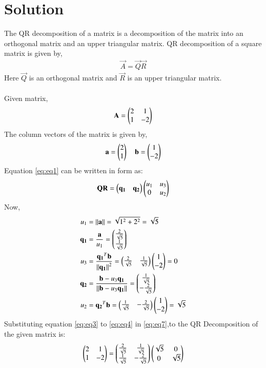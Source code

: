 \documentclass[journal,12pt,twocolumn]{IEEEtran}
\begin{document}
\section{Solution}
The QR decomposition  of a matrix is a decomposition of the matrix into an orthogonal matrix and an upper triangular matrix.
QR decomposition of a square matrix is given by,
\begin{align}
    \vec{A} = \vec{Q}\vec{R}
\end{align}
Here  $\vec{Q}$ is an orthogonal matrix and $\vec{R}$ is an upper triangular matrix.\\
\\
Given matrix,
\begin{align}
    \mathbf{A} = 
    \begin{pmatrix}2&1\\
    1&-2\end{pmatrix} \label{eq:eq1}
\end{align}
The column vectors of the matrix is given by,
\begin{align}
    \mathbf{a}=\begin{pmatrix}2\\1\end{pmatrix} \quad \mathbf{b}=\begin{pmatrix}1\\-2\end{pmatrix} \label{eq:eq2}
\end{align}
Equation \eqref{eq:eq1} can be written in  form as:
\begin{align}
    \mathbf{Q}\mathbf{R} = \begin{pmatrix}\mathbf{q_1}&\mathbf{q_2}\end{pmatrix} \begin{pmatrix}u_1&u_3\\0&u_2\end{pmatrix}  \label{eq:eq7}
\end{align}
Now, 
\begin{align}
u_1 &= \left\lVert\mathbf{a}\right\rVert = \sqrt{1^2+2^2} = \sqrt{5}\label{eq:eq3}\\
\mathbf{q_1} &= \frac{\mathbf{a}}{u_1} = \begin{pmatrix}\frac{2}{\sqrt{5}}\\ \frac{1}{\sqrt{5}}\end{pmatrix}\\
u_3 &= \frac{\mathbf{q_1}^T\mathbf{b}}{\left\lVert\mathbf{q_1}\right\rVert^2} = \begin{pmatrix}\frac{2}{\sqrt{5}}& \frac{1}{\sqrt{5}}\end{pmatrix}\begin{pmatrix}1\\-2\end{pmatrix} = 0\\
\mathbf{q_2} &= \frac{\mathbf{b} - u_3 \mathbf{q_1}}{\left\lVert\mathbf{b} - u_3 \mathbf{q_1}\right\rVert} = \begin{pmatrix}\frac{1}{\sqrt{5}}\\ -\frac{2}{\sqrt{5}}\end{pmatrix}\\
u_2 &= {\mathbf{q_2}^T\mathbf{b}} = \begin{pmatrix}\frac{1}{\sqrt{5}}&-\frac{2}{\sqrt{5}}\end{pmatrix}\begin{pmatrix}1\\-2\end{pmatrix}=\sqrt{5}\label{eq:eq4}
\end{align}
Substituting equation \eqref{eq:eq3} to \eqref{eq:eq4} in \eqref{eq:eq7},to
the QR Decomposition of the given matrix is:
\begin{align}
    \begin{pmatrix}2&1\\1&-2\end{pmatrix} = \begin{pmatrix}\frac{2}{\sqrt{5}}&\frac{1}{\sqrt{5}}\\\frac{1}{\sqrt{5}}&-\frac{2}{\sqrt{5}}\end{pmatrix}\begin{pmatrix}\sqrt{5}&0\\0&{\sqrt{5}}\end{pmatrix}
\end{align}
\\
\end{document}
